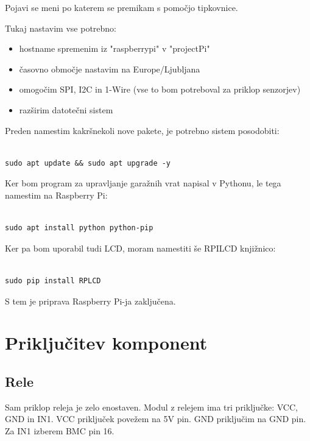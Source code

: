 \documentclass[11pt]{article}
\begin{document}
Pojavi se meni po katerem se premikam s pomočjo tipkovnice.

Tukaj nastavim vse potrebno:
\begin{itemize}
    \item hostname spremenim iz "raspberrypi" v "projectPi"
    \item časovno območje nastavim na Europe/Ljubljana
    \item omogočim SPI, I2C in 1-Wire (vse to bom potreboval za priklop senzorjev)
    \item razširim datotečni sistem
\end{itemize}

Preden namestim kakršnekoli nove pakete, je potrebno sistem posodobiti:

\begin{verbatim}

sudo apt update && sudo apt upgrade -y
\end{verbatim}

Ker bom program za upravljanje garažnih vrat napisal v Pythonu, le tega namestim na Raspberry Pi:
\begin{verbatim}

sudo apt install python python-pip
\end{verbatim}

Ker pa bom uporabil tudi LCD, moram namestiti še RPILCD knjižnico:

\begin{verbatim}

sudo pip install RPLCD
\end{verbatim}

S tem je priprava Raspberry Pi-ja zaključena.

\section{Priključitev komponent}
\subsection{Rele}
Sam priklop releja je zelo enostaven. Modul z relejem ima tri priključke: VCC, GND in IN1. VCC priključek povežem na 5V pin. GND priključim na GND pin. Za IN1 izberem BMC pin 16.
\end{document}
